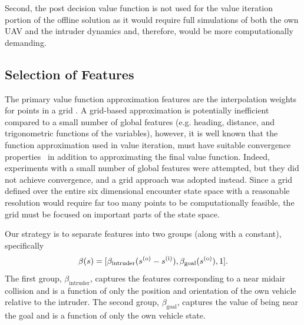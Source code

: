 Second, the post decision value function is not used for the value iteration portion of the offline solution as it would require full simulations of both the own UAV and the intruder dynamics and, therefore, would be more computationally demanding.

\subsection{Selection of Features} \label{sec:features}

The primary value function approximation features are the interpolation weights for points in a grid \cite{SD:97}. A grid-based approximation is potentially inefficient compared to a small number of global features (e.g. heading, distance, and trigonometric functions of the variables), however, it is well known that the function approximation used in value iteration, must have suitable convergence properties~\cite{JAB-AWM:95} in addition to approximating the final value function. Indeed, experiments with a small number of global features were attempted, but they did not achieve convergence, and a grid approach was adopted instead. Since a grid defined over the entire six dimensional encounter state space with a reasonable resolution would require far too many points to be computationally feasible, the grid must be focused on important parts of the state space.

Our strategy is to separate features into two groups (along with a constant), specifically
\begin{equation}
    \beta(s) = [\beta_\text{intruder}(s^{(\mathrm{o})}-s^{(\mathrm{i})}), \beta_\text{goal}(s^{(\mathrm{o})}), 1] \text{.}
\end{equation}
The first group, $\beta_\text{intruder}$, captures the features corresponding to a near midair collision and is a function of only the position and orientation of the own vehicle relative to the intruder. The second group, $\beta_\text{goal}$, captures the value of being near the goal and is a function of only the own vehicle state.

